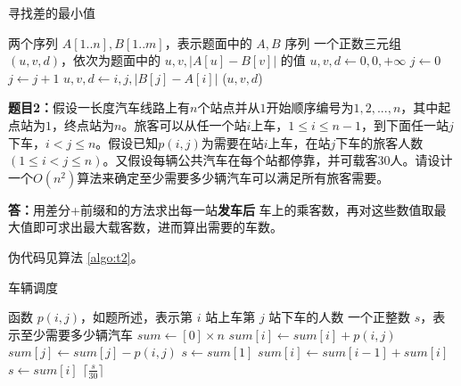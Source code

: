 \documentclass[12pt,a4paper]{ctexart}
\begin{document}
\begin{algorithm}[hp]
  \caption{寻找差的最小值} \label{algo:t1}
  \begin{algorithmic}[1]
    \Require 两个序列 $A[1..n], B[1..m]$，表示题面中的 $A, B$ 序列
    \Ensure 一个正数三元组 $(u, v, d)$，依次为题面中的 $u, v, \left|A[u]-B[v]\right|$ 的值
      \State $u, v, d \gets 0, 0, +\infty$
      \State $j \gets 0$ 
        \Repeat
          \State $j \gets j+1$
            \State $u, v, d \gets i, j, |B[j] - A[i]|$
          \EndIf
      \EndFor
      \State \Return ($u, v, d$)
    \EndFunction
  \end{algorithmic}
\end{algorithm}

\clearpage

\vspace{10pt}
\noindent
{\bf 题目2：}假设一长度汽车线路上有$n$个站点并从$1$开始顺序编号为$1,2,...,n$，其中起点站为$1$，终点站为$n$。旅客可以从任一个站$i$上车，$1 \leq i \leq n-1$，到下面任一站$j$下车，$i < j \leq n$。假设已知$p(i,j)$为需要在站$i$上车，在站$j$下车的旅客人数$(1 \leq i < j \leq n)$。又假设每辆公共汽车在每个站都停靠，并可载客$30$人。请设计一个$O(n^2)$算法来确定至少需要多少辆汽车可以满足所有旅客需要。

\vspace{5pt}
\noindent
{\bf 答：}用差分+前缀和的方法求出每一站\textbf{发车后} 车上的乘客数，再对这些数值取最大值即可求出最大载客数，进而算出需要的车数。

伪代码见算法 \ref{algo:t2}。

\begin{algorithm}
  \caption{车辆调度} \label{algo:t2}
  \begin{algorithmic}
    \Require 函数 $p(i, j)$，如题所述，表示第 $i$ 站上车第 $j$ 站下车的人数
    \Ensure 一个正整数 $s$，表示至少需要多少辆汽车
      \State $sum \gets [0] \times n$ 
          \State $sum[i] \gets sum[i] + p(i, j)$
          \State $sum[j] \gets sum[j] - p(i, j)$
        \EndFor
      \EndFor
      $s \gets sum[1]$ 
        \State $sum[i] \gets sum[i-1] + sum[i]$
          \State $s \gets sum[i]$
        \EndIf
      \EndFor
      \State \Return $\lceil \frac{s}{30} \rceil$
    \EndFunction
  \end{algorithmic}
\end{algorithm}
\end{document}

